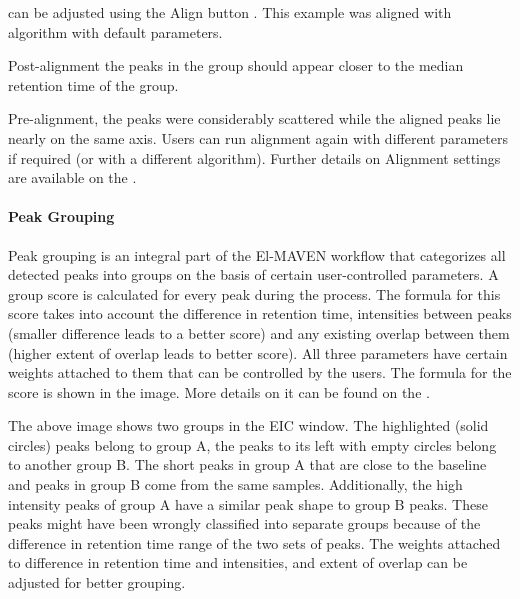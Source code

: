 \documentclass[letterpaper,10pt,english,openany,oneside]{sphinxmanual}
\begin{document}

 can be adjusted using the Align button . This example was aligned with  algorithm with default parameters.


Post-alignment the peaks in the group should appear closer to the median retention time of the group.



Pre-alignment, the peaks were considerably scattered while the aligned peaks lie nearly on the same axis. Users can run alignment again with different parameters if required (or with a different algorithm). Further details on Alignment settings are available on the .


\paragraph{Peak Grouping}
\label{\detokenize{UnlabeledLCMSWorkflow:peak-grouping}}
Peak grouping is an integral part of the El-MAVEN workflow that categorizes all detected peaks into groups on the basis of certain user-controlled parameters. A group score is calculated for every peak during the process. The formula for this score takes into account the difference in retention time, intensities between peaks (smaller difference leads to a better score) and any existing overlap between them (higher extent of overlap leads to better score). All three parameters have certain weights attached to them that can be controlled by the users. The formula for the score is shown in the image. More details on it can be found on the .



The above image shows two groups in the EIC window. The highlighted (solid circles) peaks belong to group A, the peaks to its left with empty circles belong to another group B. The short peaks in group A that are close to the baseline and peaks in group B come from the same samples. Additionally, the high intensity peaks of group A have a similar peak shape to group B peaks. These peaks might have been wrongly classified into separate groups because of the difference in retention time range of the two sets of peaks. The weights attached to difference in retention time and intensities, and extent of overlap can be adjusted for better grouping.
\end{document}
